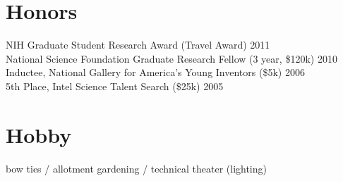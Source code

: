 \documentclass[margin]{res}
\newcommand{\nblocdatesubsection}[3]{#1 (#2) \hfill #3 }
\begin{document}
\begin{sloppypar}
\begin{resume}
\section{Honors}
\nblocdatesubsection{NIH Graduate Student Research Award}{Travel Award}{2011} \\
\nblocdatesubsection{National Science Foundation Graduate Research Fellow}{3 year, \$120k}{2010} \\
\nblocdatesubsection{Inductee, National Gallery for America's Young Inventors}{\$5k}{2006} \\
\nblocdatesubsection{5th Place, Intel Science Talent Search}{\$25k}{2005}

\section{Hobby}
bow ties / allotment gardening / technical theater (lighting)


%

\end{resume} 
\end{sloppypar}
\end{document}
